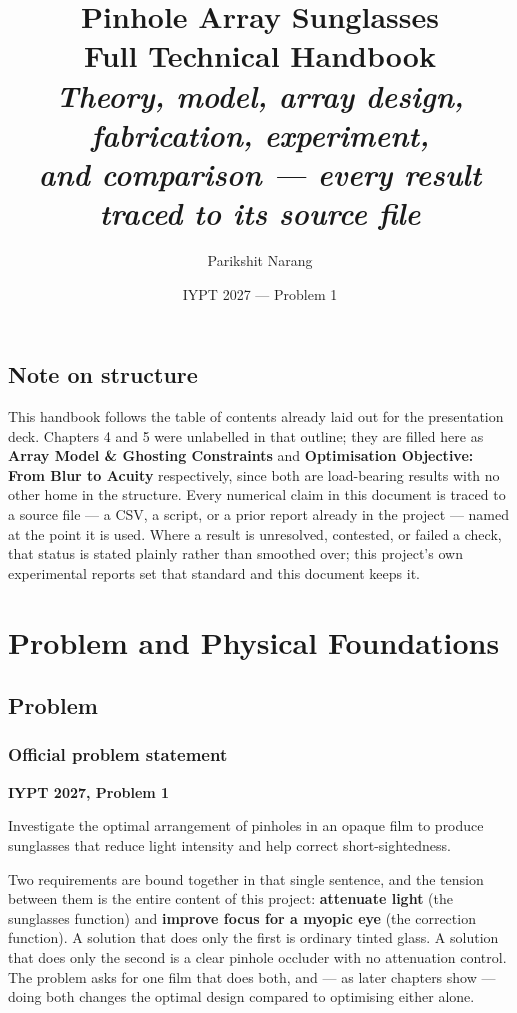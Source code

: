 \documentclass[11pt]{report}
\title{\textbf{\Huge Pinhole Array Sunglasses}\\[0.3cm]
\textcolor{hbblue}{\huge Full Technical Handbook}\\[0.6cm]
\large\itshape Theory, model, array design, fabrication, experiment,\\
and comparison --- every result traced to its source file}
\author{Parikshit Narang}
\date{IYPT 2027 --- Problem 1}
\newenvironment{keybox}[1]%
{\par\vspace{6pt}\begin{lrbox}{\kbsave}\begin{minipage}{0.88\textwidth}%
{\bfseries\color{hbblue}#1}\par\vspace{4pt}\ignorespaces}%
{\end{minipage}\end{lrbox}%
\begin{center}\setlength{\fboxrule}{1.2pt}\setlength{\fboxsep}{7pt}%
\fcolorbox{hbblue}{boxgrey}{\usebox{\kbsave}}\end{center}\vspace{6pt}\par}
\begin{document}
\maketitle
\tableofcontents

\chapter*{Note on structure}
This handbook follows the table of contents already laid out for the presentation deck.
Chapters 4 and 5 were unlabelled in that outline; they are filled here as \textbf{Array
Model \& Ghosting Constraints} and \textbf{Optimisation Objective: From Blur to Acuity}
respectively, since both are load-bearing results with no other home in the structure.
Every numerical claim in this document is traced to a source file --- a CSV, a script, or
a prior report already in the project --- named at the point it is used. Where a result is
unresolved, contested, or failed a check, that status is stated plainly rather than
smoothed over; this project's own experimental reports set that standard and this
document keeps it.

\part{Problem and Physical Foundations}

\chapter{Problem}

\section{Official problem statement}

\begin{keybox}{IYPT 2027, Problem 1}
Investigate the optimal arrangement of pinholes in an opaque film to produce sunglasses
that reduce light intensity and help correct short-sightedness.
\end{keybox}

Two requirements are bound together in that single sentence, and the tension between them
is the entire content of this project: \textbf{attenuate light} (the sunglasses function)
and \textbf{improve focus for a myopic eye} (the correction function). A solution that
does only the first is ordinary tinted glass. A solution that does only the second is a
clear pinhole occluder with no attenuation control. The problem asks for one film that
does both, and --- as later chapters show --- doing both changes the optimal design
compared to optimising either alone.
\end{document}
